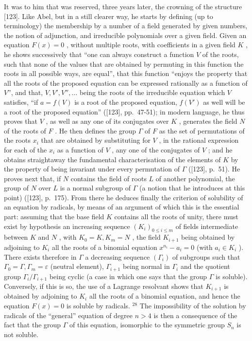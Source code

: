 It was to him that was reserved, three years later, the crowning of the structure {[}123{]}. Like Abel, but in a still clearer way, he starts by defining (up to terminology) the membership by a number of a field generated by given numbers, the notion of adjunction, and irreducible polynomials over a given field. Given an equation \(F(x) = 0\) , without multiple roots, with coefficients in a given field \(K\) , he shows successively that ``one can always construct a function \(V\) of the roots, such that none of the values that are obtained by permuting in this function the roots in all possible ways, are equal'', that this function ``enjoys the property that all the roots of the proposed equation can be expressed rationally as a function of \(V\)'', and that, \(V, V', V'', \ldots\) being the roots of the irreducible equation which \(V\) satisfies, ``if \(a = f(V)\) is a root of the proposed equation, \(f(V')\) as well will be a root of the proposed equation'' ({[}123{]}, pp.~47-51); in modern language, he thus proves that \(V\) , as well as any one of its conjugates over \(K\) , generates the field \(N\) of the roots of \(F\) . He then defines the group \(\Gamma\) of \(F\) as the set of permutations of the roots \(x_i\) that are obtained by substituting for \(V\) , in the rational expression for each of the \(x_i\) as a function of \(V\) , any one of the conjugates of \(V\) ; and he obtains straightaway the fundamental characterisation of the elements of \(K\) by the property of being invariant under every permutation of \(\Gamma\) ({[}123{]}, p.~51). He proves next that, if \(N\) contains the field of roots \(L\) of another polynomial, the group of \(N\) over \(L\) is a normal subgroup of \(\Gamma\) (a notion that he introduces at this point) ({[}123{]}, p.~175). From there he deduces finally the criterion of solubility of an equation by radicals, by means of an argument of which this is the essential part: assuming that the base field \(K\) contains all the roots of unity, there must exist by hypothesis an increasing sequence \((K_i)_{0 \leq i \leq m}\) of fields intermediate between \(K\) and \(N\) , with \(K_0 = K, K_m = N\) , the field \(K_{i+1}\) being obtained by adjoining to \(K_i\) all the roots of a binomial equation \(x^{n_i} - a_i = 0\) (with \(a_i \in K_i\) ). There exists therefore in \(\Gamma\) a decreasing sequence \((\Gamma_i)\) of subgroups such that \(\Gamma_0 = \Gamma, \Gamma_m = \varepsilon\) (neutral element), \(\Gamma_{i+1}\) being normal in \(\Gamma_i\) and the quotient group \(\Gamma_i / \Gamma_{i+1}\) being cyclic (a case in which one says that the group \(\Gamma\) is soluble). Conversely, if this is so, the use of a Lagrange resolvant shows that \(K_{i+1}\) is obtained by adjoining to \(K_i\) all the roots of a binomial equation, and hence the equation \(F(x) = 0\) is soluble by radicals. \(^{28}\) The impossibility of the solution by radicals of the ``general'' equation of degree \(n > 4\) is then a consequence of the fact that the group \(\Gamma\) of this equation, isomorphic to the symmetric group \(S_n\) is not soluble.

